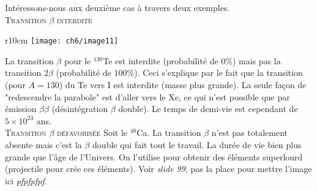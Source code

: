 Intéressons-nous aux deuxième cas à travers deux exemples. \\

\textsc{Transition $\beta$ interdite}\ \\

	\begin{wrapfigure}[12]{r}{10cm}
	\vspace{-8mm}
	\texttt{[image: ch6/image11]}
	\end{wrapfigure}
	
La transition $\beta$ pour le $^130$Te est interdite (probabilité de 0\%) mais pas la transition 
$2\beta$ (probabilité de 100\%). Ceci s'explique par le fait que la transition (pour $A=130$) du Te 
vers I est interdite (masse plus grande). La seule façon de "redescendre la parabole" est d'aller vers 
le Xe, ce qui n'est possible que par émission $\beta\beta$ (désintégration $\beta$ double). Le temps de
demi-vie est cependant de $5\times 10^23$ ans.\\







\textsc{Transition $\beta$ défavorisée}
Soit le $^{48}$Ca. La transition $\beta$ n'est pas totalement absente mais c'est la $\beta$ double qui fait
tout le travail. La durée de vie bien plus grande que l'âge de l'Univers. On l'utilise pour obtenir des éléments
superlourd (projectile pour crée ces éléments). Voir \textit{slide 99}, pas la place pour mettre l'image 
ici \textit{pfpfpfpf}.